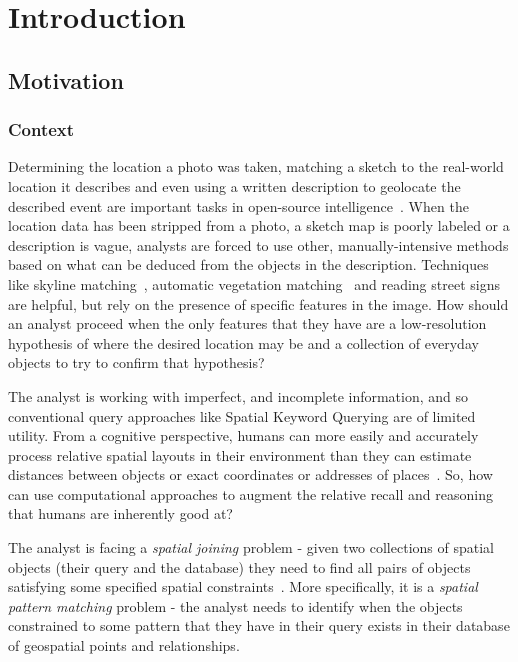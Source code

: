 \section{Introduction}

\label{section:introduction}

\subsection{Motivation}
\subsubsection{Context}
\par{
    Determining the location a photo was taken, matching a sketch to the real-world location it describes and even using a written description to geolocate the described event are important tasks in open-source intelligence~\cite{Higgins2021, Williams2023}.
    When the location data has been stripped from a photo, a sketch map is poorly labeled or a description is vague, analysts are forced to use other, manually-intensive methods based on what can be deduced from the objects in the description.
    Techniques like skyline matching~\cite{Stein1995, Baatz2012}, automatic vegetation matching~\cite{Schmidt2022} and reading street signs are helpful, but rely on the presence of specific features in the image.
    How should an analyst proceed when the only features that they have are a low-resolution hypothesis of where the desired location may be and a collection of everyday objects to try to confirm that hypothesis?
}
\par{
    The analyst is working with imperfect, and incomplete information, and so conventional query approaches like Spatial Keyword Querying are of limited utility. 
    From a cognitive perspective, humans can more easily and accurately process relative spatial layouts in their environment than they can estimate distances between objects or exact coordinates or addresses of places~\cite{Schwering2014, Weisberg2016, Miller2013, Keatley2021}.
    So, how can use computational approaches to augment the relative recall and reasoning that humans are inherently good at?
}

\par{
     The analyst is facing a \textit{spatial joining} problem - given two collections of spatial objects (their query and the database) they need to  find all pairs of objects satisfying some specified spatial constraints~\cite{Jacox2007}. 
    More specifically, it is a \textit{spatial pattern matching} problem - the analyst needs to identify when the objects constrained to some pattern that they have in their query exists in their database of geospatial points and relationships.
}


